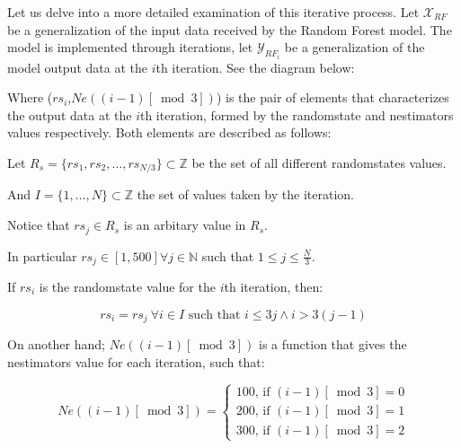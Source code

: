 \documentclass{article}
\begin{document}
Let us delve into a more detailed examination of this iterative process. Let $\mathcal{X}_{RF}$ be a generalization of the input data received by the Random Forest model. The model is implemented through iterations, let $\mathcal{Y}_{RF_i}$ be a generalization of the model output data at the $i$th iteration. See the diagram below:

\begin{center}
\end{center}

Where ($rs_i$,$Ne((i-1)[\bmod{3}])$) is the pair of elements that characterizes the output data at the $i$th iteration, formed by the random\textunderscore state and n\textunderscore estimators values respectively. Both elements are described as follows:

Let $R_s = \{rs_1, rs_2, \ldots , rs_{N/3}\} \subset \mathds{Z}$ be the set of all different random\textunderscore states values.

And $I = \{1, \ldots , N\} \subset \mathds{Z}$ the set of values taken by the iteration.

Notice that $rs_j \in R_s$ is an arbitary value in $R_s$.

In particular $rs_j \in [1,500] \forall j \in \mathds{N}$ such that $1 \leq j \leq \frac{N}{3}$.

If $rs_i$ is the random\textunderscore state value for the $i$th iteration, then:

\begin{equation*}
  rs_i = rs_j \ \forall i \in I \text{ such that } i \leq 3j \wedge i > 3(j-1)
\end{equation*}

On another hand; $Ne((i-1)[\bmod{3}])$ is a function that gives the n\textunderscore estimators value for each iteration, such that:

\[
Ne((i-1)[\bmod{3}]) =
\begin{cases}
  100 \text{, if } (i-1)[\bmod{3}] = 0 \\
  200 \text{, if } (i-1)[\bmod{3}] = 1 \\
  300 \text{, if } (i-1)[\bmod{3}] = 2
\end{cases}
\]
\end{document}
